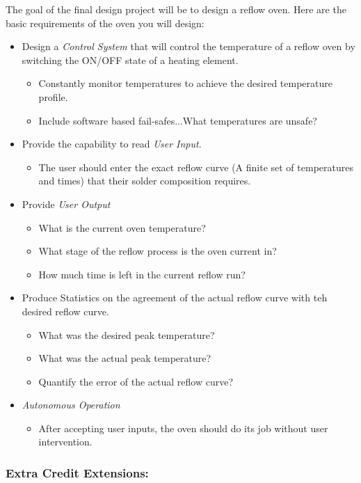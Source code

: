 \documentclass[10pt]{report}
\begin{document}
\par The goal of the final design project will be to design a reflow oven. Here are the basic requirements of the oven you will design:


\begin{itemize}
\item Design a \emph{Control System}  that will control the temperature of a reflow oven by switching the ON/OFF state of a heating element.
	\begin{itemize}
	\item Constantly monitor temperatures to achieve the desired temperature profile.
	\item Include software based fail-safes...What temperatures are unsafe?
	\end{itemize}
\item Provide the capability to read \emph{User Input}.
	\begin{itemize}
	\item The user should enter the exact reflow curve (A finite set of temperatures and times) that their solder composition requires.
	\end{itemize}
\item 	Provide \emph{User Output}
	\begin{itemize}
	\item What is the current oven temperature?
	\item What stage of the reflow process is the oven current in?
	\item How much time is left in the current reflow run?
	\end{itemize}
\item Produce Statistics on the agreement of the actual reflow curve with teh desired reflow curve.
	\begin{itemize}
	\item What was the desired peak temperature?
	\item What was the actual peak temperature?
	\item Quantify the error of the actual reflow curve?
	\end{itemize}
\item \emph{Autonomous Operation}
	\begin{itemize}
	\item After accepting user inputs, the oven should do its job without user intervention.
	\end{itemize}
\end{itemize}

\subsubsection{Extra Credit Extensions:}
\end{document}
